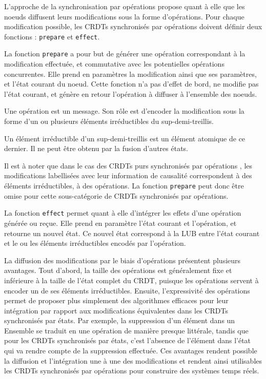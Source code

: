 L'approche de la synchronisation par opérations propose quant à elle que les noeuds diffusent leurs modifications sous la forme d'opérations.
Pour chaque modification possible, les \acp{CRDT} synchronisés par opérations doivent définir deux fonctions : \texttt{prepare} et \texttt{effect}.

La fonction \texttt{prepare} a pour but de générer une opération correspondant à la modification effectuée, et commutative avec les potentielles opérations concurrentes.
Elle prend en paramètres la modification ainsi que ses paramètres, et l'état courant du noeud.
Cette fonction n'a pas d'effet de bord, \ie ne modifie pas l'état courant, et génère en retour l'opération à diffuser à l'ensemble des noeuds.

Une opération est un message.
Son rôle est d'encoder la modification sous la forme d'un ou plusieurs éléments irréductibles du sup-demi-treillis.

\begin{definition}
  \label{def:irreducible-element}
  Un élément irréductible d'un sup-demi-treillis est un élément atomique de ce dernier.
  Il ne peut être obtenu par la fusion d'autres états.
\end{definition}

Il est à noter que dans le cas des \acp{CRDT} purs synchronisés par opérations \cite{baquero2017pure}, les modifications labellisées avec leur information de causalité correspondent à des éléments irréductibles, \ie à des opérations.
La fonction \texttt{prepare} peut donc être omise pour cette sous-catégorie de \acp{CRDT} synchronisés par opérations.

La fonction \texttt{effect} permet quant à elle d'intégrer les effets d'une opération générée ou reçue.
Elle prend en paramètre l'état courant et l'opération, et retourne un nouvel état.
Ce nouvel état correspond à la \ac{LUB} entre l'état courant et le ou les éléments irréductibles encodés par l'opération.

La diffusion des modifications par le biais d'opérations présentent plusieurs avantages.
Tout d'abord, la taille des opérations est généralement fixe et inférieure à la taille de l'état complet du \ac{CRDT}, puisque les opérations servent à encoder un de ses éléments irréductibles.
Ensuite, l'expressivité des opérations permet de proposer plus simplement des algorithmes efficaces pour leur intégration par rapport aux modifications équivalentes dans les \acp{CRDT} synchronisés par états.
Par exemple, la suppression d'un élément dans un Ensemble se traduit en une opération de manière presque littérale, tandis que pour les \acp{CRDT} synchronisés par états, c'est l'absence de l'élément dans l'état qui va rendre compte de la suppression effectuée.
Ces avantages rendent possible la diffusion et l'intégration une à une des modifications et rendent ainsi utilisables les \acp{CRDT} synchronisés par opérations pour construire des systèmes temps réels.

